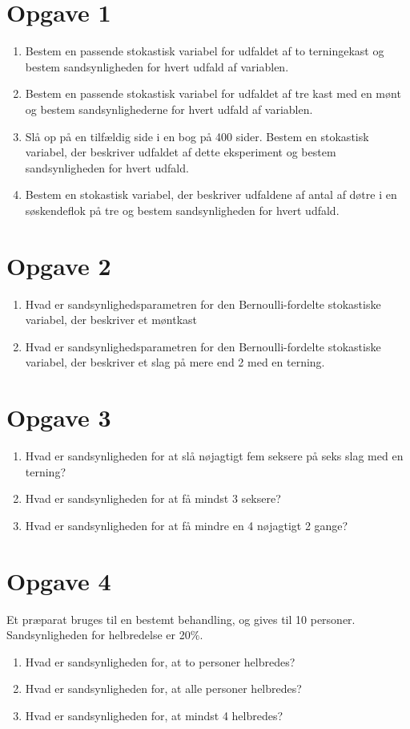 \section*{Opgave 1}
\begin{enumerate}[label=\roman*)]
\item Bestem en passende stokastisk variabel for udfaldet af to terningekast og bestem sandsynligheden for hvert udfald af variablen. 
\item Bestem en passende stokastisk variabel for udfaldet af tre kast med en mønt og bestem sandsynlighederne for hvert udfald af variablen. 
\item Slå op på en tilfældig side i en bog på 400 sider. Bestem en stokastisk variabel, der beskriver udfaldet af dette eksperiment og bestem sandsynligheden for hvert udfald. 
\item Bestem en stokastisk variabel, der beskriver udfaldene af antal af døtre i en søskendeflok på tre og bestem sandsynligheden for hvert udfald. 
\end{enumerate}
\section*{Opgave 2}
\begin{enumerate}[label=\roman*)]
\item Hvad er sandsynlighedsparametren for den Bernoulli-fordelte stokastiske variabel, der beskriver et møntkast
\item Hvad er sandsynlighedsparametren for den Bernoulli-fordelte stokastiske variabel, der beskriver et slag på mere end 2 med en terning.
\end{enumerate}
\section*{Opgave 3}
\begin{enumerate}[label=\roman*)]
\item Hvad er sandsynligheden for at slå nøjagtigt fem seksere på seks slag med en terning?
\item Hvad er sandsynligheden for at få mindst 3 seksere?
\item Hvad er sandsynligheden for at få mindre en 4 nøjagtigt 2 gange?
\end{enumerate}
\section*{Opgave 4}
Et præparat bruges til en bestemt behandling, og gives til 10 personer. Sandsynligheden for helbredelse er 20$\%$. 
\begin{enumerate}[label=\roman*)]
\item Hvad er sandsynligheden for, at to personer helbredes?
\item Hvad er sandsynligheden for, at alle personer helbredes?
\item Hvad er sandsynligheden for, at mindst 4 helbredes? 
\end{enumerate}

